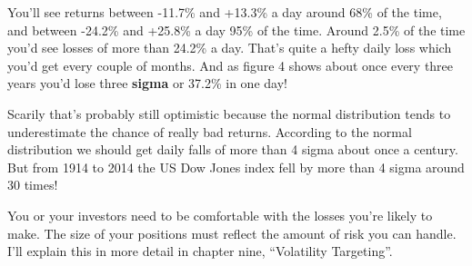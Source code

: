 You'll see returns between -11.7\% and +13.3\% a day around 68\% of the time, and between -24.2\% and +25.8\% a day 95\% of the time. Around 2.5\% of the time you'd see losses of more than 24.2\% a day. That's quite a hefty daily loss which you'd get every couple of months. And as figure 4 shows about once every three years you'd lose three \textbf{sigma} or 37.2\% in one day!

Scarily that's probably still optimistic because the normal distribution tends to underestimate the chance of really bad returns. According to the normal distribution we should get daily falls of more than 4 sigma about once a century. But from 1914 to 2014 the US Dow Jones index fell by more than 4 sigma around 30 times!

You or your investors need to be comfortable with the losses you're likely to make. The size of your positions must reflect the amount of risk you can handle. I'll explain this in more detail in chapter nine, ``Volatility Targeting''.
